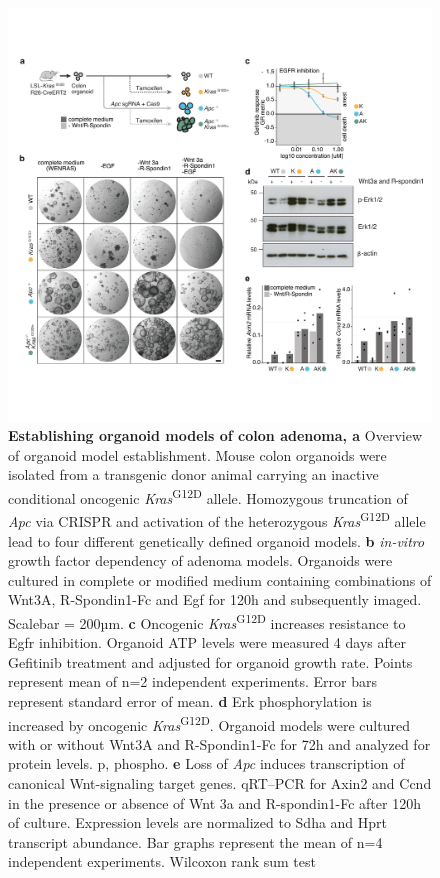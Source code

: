 \begin{flushleft}
\begin{figure}[h]
\centering
\includegraphics[width=\textwidth,
                height=\textheight,
                keepaspectratio]{figures/adenomaprofiling/pdf/fig_1_0.pdf}
\caption[Establishing organoid models of colon adenoma]{\textbf{Establishing organoid models of colon adenoma, a} Overview of organoid model establishment. Mouse colon organoids were isolated from a transgenic donor animal carrying an inactive conditional oncogenic \textit{Kras}\textsuperscript{G12D} allele. Homozygous truncation of \textit{Apc} via CRISPR and activation of the heterozygous \textit{Kras}\textsuperscript{G12D} allele lead to four different genetically defined organoid models.
\textbf{b} \textit{in-vitro} growth factor dependency of adenoma models. Organoids were cultured in complete or modified medium containing combinations of Wnt3A, R-Spondin1-Fc and Egf for 120h and subsequently imaged. Scalebar = 200µm.
\textbf{c}	Oncogenic \textit{Kras}\textsuperscript{G12D} increases resistance to Egfr inhibition. Organoid ATP levels were measured 4 days after Gefitinib treatment and adjusted for organoid growth rate. Points represent mean of n=2 independent experiments. Error bars represent standard error of mean.
\textbf{d} Erk phosphorylation is increased by oncogenic \textit{Kras}\textsuperscript{G12D}. Organoid models were cultured with or without Wnt3A and R-Spondin1-Fc for 72h and analyzed for protein levels. p, phospho.   
\textbf{e}	Loss of \textit{Apc} induces transcription of canonical Wnt-signaling target genes. qRT–PCR for Axin2 and Ccnd in the presence or absence of Wnt 3a and R-spondin1-Fc after 120h of culture. Expression levels are normalized to Sdha and Hprt transcript abundance. Bar graphs represent the mean of n=4 independent experiments. Wilcoxon rank sum test 
}
\label{fig_a10}
\end{figure}
\bigbreak


\end{flushleft}
